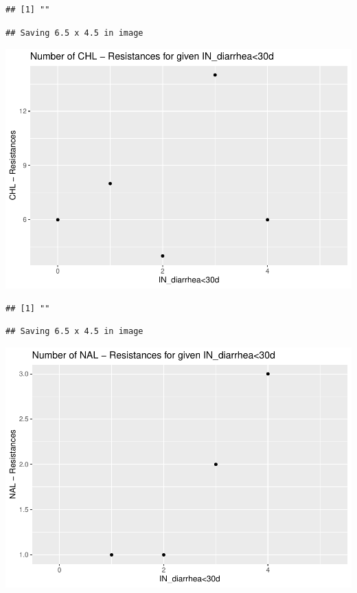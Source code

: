 \documentclass[
]{article}
\begin{document}
\begin{verbatim}
## [1] ""
\end{verbatim}

\begin{verbatim}
## Saving 6.5 x 4.5 in image
\end{verbatim}

\includegraphics{NResistenzen_files/figure-latex/numerical_variables-36.pdf}

\begin{verbatim}
## [1] ""
\end{verbatim}

\begin{verbatim}
## Saving 6.5 x 4.5 in image
\end{verbatim}

\includegraphics{NResistenzen_files/figure-latex/numerical_variables-37.pdf}
\end{document}
